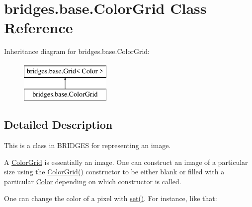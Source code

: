 \hypertarget{classbridges_1_1base_1_1_color_grid}{}\section{bridges.\+base.\+Color\+Grid Class Reference}
\label{classbridges_1_1base_1_1_color_grid}
Inheritance diagram for bridges.\+base.\+Color\+Grid\+:\begin{figure}[H]
\begin{center}
\leavevmode
\includegraphics[height=2.000000cm]{classbridges_1_1base_1_1_color_grid}
\end{center}
\end{figure}


\subsection{Detailed Description}
This is a class in B\+R\+I\+D\+G\+ES for representing an image. 

A \mbox{\hyperlink{classbridges_1_1base_1_1_color_grid}{Color\+Grid}} is essentially an image. One can construct an image of a particular size using the \mbox{\hyperlink{classbridges_1_1base_1_1_color_grid_af434a5a3dcbaf86e51ac6f9e1c1d7e5f}{Color\+Grid()}} constructor to be either blank or filled with a particular \mbox{\hyperlink{classbridges_1_1base_1_1_color}{Color}} depending on which constructor is called.

One can change the color of a pixel with \mbox{\hyperlink{classbridges_1_1base_1_1_grid_ab79ceb737423bb28ea2348e61a625a17}{set()}}. For instance, like that\+: 
\begin{DoxyCode}{0}
\end{DoxyCode}


